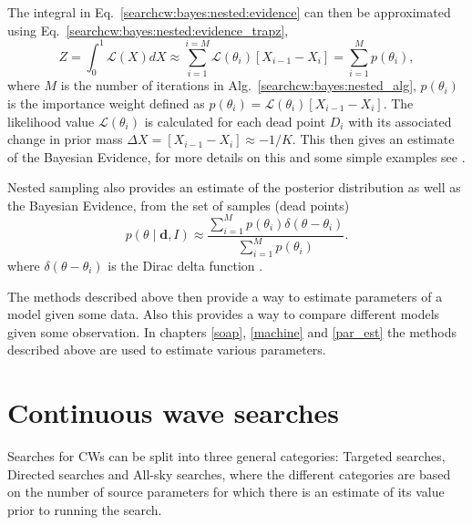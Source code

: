 The integral in Eq.~\ref{searchcw:bayes:nested:evidence} can then be approximated using Eq.~\ref{searchcw:bayes:nested:evidence_trapz},
\begin{equation}
\label{searchcw:bayes:nested:approx_evidence}
	Z = \int_0^1 \mathcal{L}(X) dX \approx \sum_{i=1}^{i=M}  \mathcal{L}(\theta_i)  \left[ X_{i-1} - X_{i} \right] = \sum_{i=1}^{M} p(\theta_i),
\end{equation}
where $M$ is the number of iterations in Alg.~\ref{searchcw:bayes:nested_alg}, $p(\theta_i)$ is the importance weight defined as $p(\theta_i) =  \mathcal{L}(\theta_i) \left[ X_{i-1} - X_{i} \right]$. The likelihood value $\mathcal{L}(\theta_i)$ is calculated for each dead point $D_i$ with its associated change in prior mass $\Delta X = \left[ X_{i-1} - X_{i} \right] \approx -1/K$. 
This then gives an estimate of the Bayesian Evidence, for more details on this and some simple examples see \citep{skilling2006NestedSampling,speagle2019DynestyDynamic,feroz2019ImportanceNested}.

Nested sampling also provides an estimate of the posterior distribution as well as the Bayesian Evidence, from the set of samples (dead points) 
\begin{equation}
	p(\theta \mid \bm{d}, I) \approx \frac{\sum_{i=1}^{M} p(\theta_i) \delta(\theta - \theta_i)}{\sum_{i=1}^{M} p(\theta_i) }.
\end{equation}
where $\delta( \theta - \theta_i)$ is the Dirac delta
function \citep{speagle2019DynestyDynamic}.~

The methods described above then provide a way to estimate parameters of a
model given some data.  Also this provides a way to compare different models
given some observation.  In chapters \ref{soap}, \ref{machine} and
\ref{par_est} the methods described above are used to estimate various
parameters.

\section{\label{searchcw:search} Continuous wave searches}

Searches for \glspl{CW} can be split into three general categories: Targeted
searches, Directed searches and All-sky searches, where the different
categories are based on the number of source parameters for which there is an estimate of its value prior to running the search.

